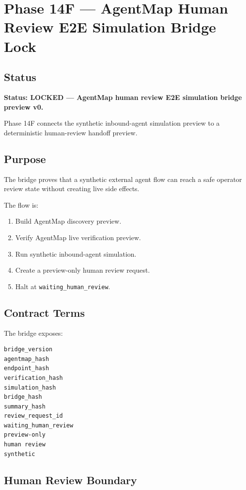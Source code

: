 \section{Phase 14F --- AgentMap Human Review E2E Simulation Bridge Lock}
\label{sec:phase14f-agentmap-human-review-simulation-bridge-lock}

\subsection{Status}

\textbf{Status: LOCKED --- AgentMap human review E2E simulation bridge preview v0.}

Phase 14F connects the synthetic inbound-agent simulation preview to a deterministic human-review handoff preview.

\subsection{Purpose}

The bridge proves that a synthetic external agent flow can reach a safe operator review state without creating live side effects.

The flow is:

\begin{enumerate}
  \item Build AgentMap discovery preview.
  \item Verify AgentMap live verification preview.
  \item Run synthetic inbound-agent simulation.
  \item Create a preview-only human review request.
  \item Halt at \texttt{waiting\_human\_review}.
\end{enumerate}

\subsection{Contract Terms}

The bridge exposes:

\begin{verbatim}
bridge_version
agentmap_hash
endpoint_hash
verification_hash
simulation_hash
bridge_hash
summary_hash
review_request_id
waiting_human_review
preview-only
human review
synthetic
\end{verbatim}

\subsection{Human Review Boundary}

